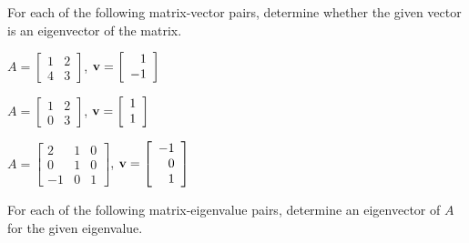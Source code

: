 
\be
\item For each of the following matrix-vector pairs, determine whether the given vector is an eigenvector of the matrix.

\ba
\item $A=\left[ \begin{array}{cc} 1&2 \\ 4&3 \end{array} \right]$, $\mathbf{v}=\left[ \begin{array}{r} 1\\-1 \end{array} \right]$

\item $A=\left[ \begin{array}{cc} 1&2 \\ 0&3 \end{array} \right]$, $\mathbf{v}=\left[ \begin{array}{r} 1\\1 \end{array} \right]$


\item $A=\left[ \begin{array}{rcc} 2&1&0 \\ 0&1&0 \\ -1&0&1 \end{array} \right]$, $\mathbf{v}=\left[ \begin{array}{r} -1\\0\\1 \end{array} \right]$

\ea

\item For each of the following matrix-eigenvalue pairs, determine an eigenvector of $A$ for the given eigenvalue. \\

